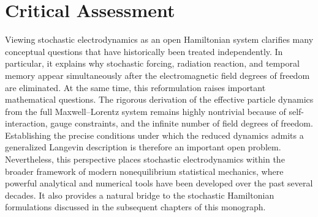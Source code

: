 \section*{Critical Assessment}
Viewing stochastic electrodynamics as an open Hamiltonian system
clarifies many conceptual questions that have historically been treated
independently. In particular, it explains why stochastic forcing,
radiation reaction, and temporal memory appear simultaneously after the
electromagnetic field degrees of freedom are eliminated.
At the same time, this reformulation raises important mathematical
questions. The rigorous derivation of the effective particle dynamics
from the full Maxwell--Lorentz system remains highly nontrivial because
of self-interaction, gauge constraints, and the infinite number of field
degrees of freedom. Establishing the precise conditions under which the
reduced dynamics admits a generalized Langevin description is therefore
an important open problem.
Nevertheless, this perspective places stochastic electrodynamics within
the broader framework of modern nonequilibrium statistical mechanics,
where powerful analytical and numerical tools have been developed over
the past several decades. It also provides a natural bridge to the
stochastic Hamiltonian formulations discussed in the subsequent chapters
of this monograph.
